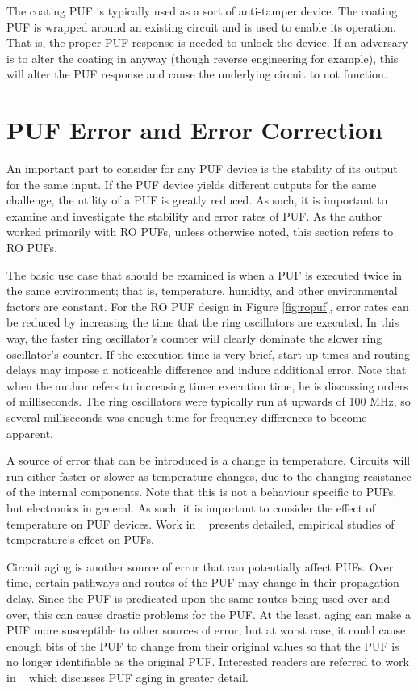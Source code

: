 The coating PUF is typically used as a sort of anti-tamper device. The coating PUF is wrapped
around an existing circuit and is used to enable its operation. That is, the proper PUF response
is needed to unlock the device. If an adversary is to alter the coating in anyway (though reverse engineering 
for example), this will alter the PUF response and cause the underlying circuit to not function. 

\section{PUF Error and Error Correction}
An important part to consider for any PUF device is the stability of its output for
the same input. If the PUF device yields different outputs for the same challenge, the
utility of a PUF is greatly reduced. As such, it is important to examine and investigate
the stability and error rates of PUF. As the author worked primarily with RO PUFs, unless
otherwise noted, this section refers to RO PUFs.

The basic use case that should be examined is when a PUF is executed twice in the same
environment; that is, temperature, humidty, and other environmental factors are constant.
For the RO PUF design in Figure \ref{fig:ropuf}, error rates can be reduced by increasing
the time that the ring oscillators are executed. In this way, the faster ring oscillator's
counter will clearly dominate the slower ring oscillator's counter. If the execution time
is very brief, start-up times and routing delays may impose a noticeable difference and
induce additional error. Note that when the author refers to increasing timer execution
time, he is discussing orders of milliseconds. The ring oscillators were typically run
at upwards of 100 MHz, so several milliseconds was enough time for frequency differences
to become apparent.

A source of error that can be introduced is a change in temperature. Circuits will run 
either faster or slower as temperature changes, due to the changing resistance of the
internal components. Note that this is not a behaviour specific to PUFs, but electronics
in general. As such, it is important to consider the effect of temperature on PUF devices.
Work in ~\cite{puftemp} presents detailed, empirical studies of temperature's effect on
PUFs.


Circuit aging is another source of error that can potentially affect PUFs. Over time,
certain pathways and routes of the PUF may change in their propagation delay. Since the
PUF is predicated upon the same routes being used over and over, this can cause drastic
problems for the PUF. At the least, aging can make a PUF more susceptible to other
sources of error, but at worst case, it could cause enough bits of the PUF to change
from their original values so that the PUF is no longer identifiable as the original PUF.
Interested readers are referred to work in ~\cite{pufaging} 
which discusses PUF aging in greater detail.

